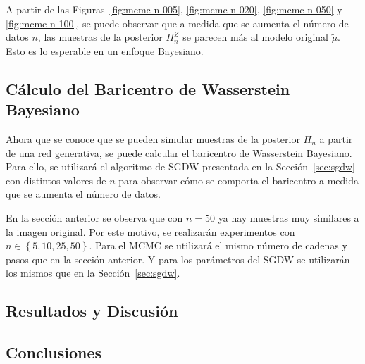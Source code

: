 A partir de las Figuras~\ref{fig:mcmc-n-005}, \ref{fig:mcmc-n-020}, \ref{fig:mcmc-n-050} y \ref{fig:mcmc-n-100}, se puede observar que a medida que se aumenta el número de datos $n$, las muestras de la posterior $\Pi^Z_n$ se parecen más al modelo original $\tilde\mu$. Esto es lo esperable en un enfoque Bayesiano.

\subsection{Cálculo del Baricentro de Wasserstein Bayesiano}\label{ssec:calc-bwb}  %

Ahora que se conoce que se pueden simular muestras de la posterior $\Pi_n$ a partir de una red generativa, se puede calcular el baricentro de Wasserstein Bayesiano. Para ello, se utilizará el algoritmo de SGDW presentada en la Sección~\ref{sec:sgdw} con distintos valores de $n$ para observar cómo se comporta el baricentro a medida que se aumenta el número de datos.

En la sección anterior se observa que con $n = 50$ ya hay muestras muy similares a la imagen original. Por este motivo, se realizarán experimentos con $n \in \left\{ 5, 10, 25, 50 \right\}$. Para el MCMC se utilizará el mismo número de cadenas y pasos que en la sección anterior.
Y para los parámetros del SGDW se utilizarán los mismos que en la Sección~\ref{sec:sgdw}.


\subsection{Resultados y Discusión}\label{ssec:bwb-resultados-discusion}  %


\subsection{Conclusiones}\label{ssec:bwb-conclusiones}  %


